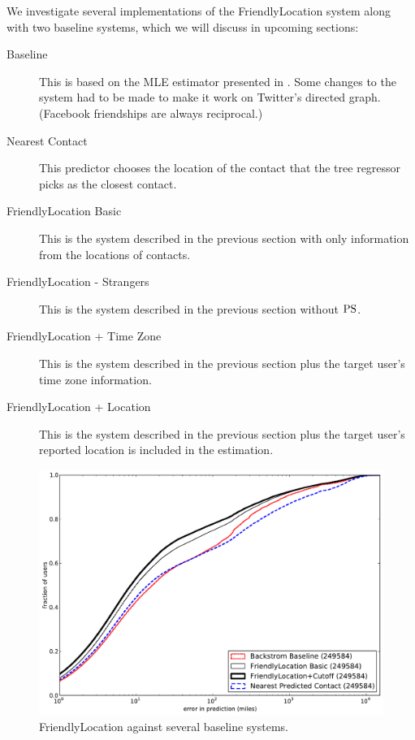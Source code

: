 We investigate several implementations of the FriendlyLocation system along
with two baseline systems, which we will discuss in upcoming sections:
\begin{description}
\item[Baseline] This is based on the MLE estimator presented in
    \cite{backstrom2010find}. Some changes to the system had to be made to make it
    work on Twitter's directed graph. (Facebook friendships are always
    reciprocal.)
\item[Nearest Contact] This predictor chooses the location of the contact that
    the tree regressor picks as the closest contact.
\item[FriendlyLocation Basic] This is the system described in the previous
    section with only information from the locations of contacts.
\item[FriendlyLocation - Strangers] This is the system described in the previous
    section without $\operatorname{PS}$.
\ifdefined\THESIS
\item[FriendlyLocation + Time Zone] This is the system described in the previous
    section plus the target user's time zone information.
\fi
\item[FriendlyLocation + Location] This is the system described in the previous
    section plus the target user's reported location is included in the
    estimation.
\end{description}

\begin{figure}[tb]
\centering
\includegraphics[width=\linewidth]{figures/fl_basic.pdf}
\caption{
    FriendlyLocation against several baseline systems.
}
\label{fig:results}
\end{figure}

